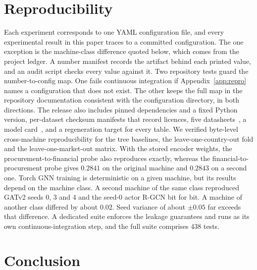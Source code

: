 \documentclass[conference]{IEEEtran}
\begin{document}
\section{Reproducibility}
\label{sec:reproducibility}

Each experiment corresponds to one YAML configuration file, and every
experimental result in this paper traces to a committed configuration. The one
exception is the machine-class difference quoted below, which comes from the
project ledger. A number manifest records the artifact behind each printed
value, and an audit script checks every value against it. Two repository tests guard the number-to-config map. One fails continuous
integration if Appendix~\ref{app:repro} names a configuration that does not
exist. The other keeps the full map in the repository documentation consistent
with the configuration directory, in both directions. The release also includes pinned
dependencies and a fixed Python version, per-dataset checksum manifests that
record licences, five datasheets~\cite{gebru2021}, a model
card~\cite{mitchell2019}, and a regeneration target for every table. We
verified byte-level cross-machine reproducibility for the tree baselines, the
leave-one-country-out fold and the leave-one-market-out matrix. With the stored
encoder weights, the procurement-to-financial probe also reproduces exactly,
whereas the financial-to-procurement probe gives $0.2841$ on the original
machine and $0.2843$ on a second one. Torch GNN training is deterministic on a
given machine, but its results depend on the machine class. A second machine of
the same class reproduced GATv2 seeds 0, 3 and 4 and the seed-0 actor R-GCN bit
for bit. A machine of another class differed by about $0.02$. Seed
variance of about $\pm 0.05$ far exceeds that difference. A dedicated suite
enforces the leakage guarantees and runs as its own continuous-integration
step, and the full suite comprises 438 tests.

\section{Conclusion}
\end{document}
